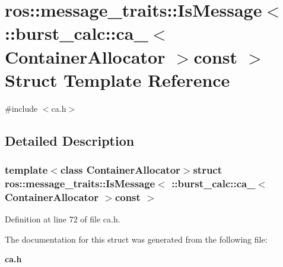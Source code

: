 \section{ros\-:\-:message\-\_\-traits\-:\-:\-Is\-Message$<$ \-:\-:burst\-\_\-calc\-:\-:ca\-\_\-$<$ \-Container\-Allocator $>$const $>$ \-Struct \-Template \-Reference}
\label{structros_1_1message__traits_1_1IsMessage_3_01_1_1burst__calc_1_1ca___3_01ContainerAllocator_01_4const_01_01_4}


{\ttfamily \#include $<$ca.\-h$>$}



\subsection{\-Detailed \-Description}
\subsubsection*{template$<$class Container\-Allocator$>$struct ros\-::message\-\_\-traits\-::\-Is\-Message$<$ \-::burst\-\_\-calc\-::ca\-\_\-$<$ Container\-Allocator $>$const  $>$}



\-Definition at line 72 of file ca.\-h.



\-The documentation for this struct was generated from the following file\-:\begin{DoxyCompactItemize}
\item 
{\bf ca.\-h}\end{DoxyCompactItemize}

